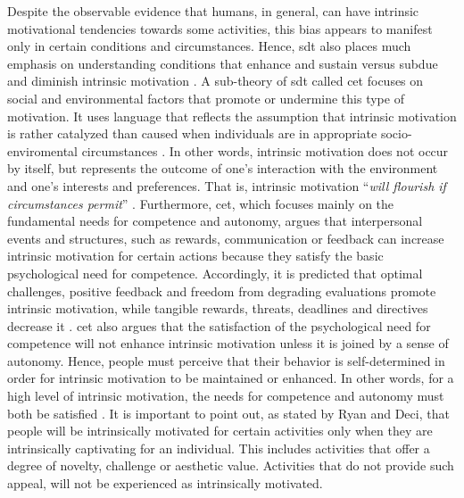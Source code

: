 Despite the observable evidence that humans, in general, can have intrinsic motivational tendencies towards some activities, this bias appears to manifest only in certain conditions and circumstances. Hence, \acrshort{sdt} also places much emphasis on understanding conditions that enhance and sustain versus subdue and diminish intrinsic motivation \cite{ryan2000intrinsic}. A sub-theory of \acrshort{sdt} called \acrfull{cet} focuses on social and environmental factors that promote or undermine this type of motivation. It uses language that reflects the assumption that intrinsic motivation is rather catalyzed than caused when individuals are in appropriate socio-enviromental circumstances \cite{ryan2000intrinsic, ryan2000self}. In other words, intrinsic motivation does not occur by itself, but represents the outcome of one's interaction with the environment and one's interests and preferences. That is, intrinsic motivation ``\textit{will flourish if circumstances permit}'' \cite{ryan2000self}. Furthermore, \acrshort{cet}, which focuses mainly on the fundamental needs for competence and autonomy, argues that interpersonal events and structures, such as rewards, communication or feedback can increase intrinsic motivation for certain actions because they satisfy the basic psychological need for competence. Accordingly, it is predicted that optimal challenges, positive feedback and freedom from degrading evaluations promote intrinsic motivation, while tangible rewards, threats, deadlines  and  directives decrease it \cite{ryan2000self}. \acrshort{cet} also argues that the satisfaction of the psychological need for competence will not enhance intrinsic motivation unless it is joined by a sense of autonomy. Hence, people must perceive that their behavior is self-determined in order for intrinsic motivation to be maintained or enhanced. In other words, for a high level of intrinsic motivation, the needs for competence and autonomy must both be satisfied \cite{ryan2000self}. It is important to point out, as stated by Ryan and Deci, that people will be intrinsically motivated for certain activities only when they are intrinsically captivating for an individual. This includes activities that offer a degree of novelty, challenge or aesthetic value. Activities that do not provide such appeal, will not be experienced as intrinsically motivated. \\
